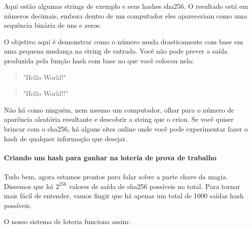 Aqui estão algumas strings de exemplo e seus hashes sha256. O resultado está em números decimais, embora dentro de um computador eles apareceriam como uma sequência binária de uns e zeros.

O objetivo aqui é demonstrar como o número muda drasticamente com base em uma pequena mudança na string de entrada. Você não pode prever a saída produzida pela função hash com base no que você colocou nela:

\begin{samepage}
\begin{quote}{"Hello World!"\newline
}\end{quote}
\end{samepage}

\begin{samepage}
\begin{quote}{"Hello World!!"\newline
}\end{quote}
\end{samepage}

Não há como ninguém, nem mesmo um computador, olhar para o número de aparência aleatória resultante e descobrir a string que o criou. Se você quiser brincar com o sha256, há alguns sites online onde você pode experimentar fazer o hash de qualquer informação que desejar.

\paragraph{Criando um hash para ganhar na loteria de prova de trabalho}
\paragraph{}
 

Tudo bem, agora estamos prontos para falar sobre a parte chave da magia. Dissemos que há \(2^{256}\) valores de saída de sha256 possíveis no total. Para tornar mais fácil de entender, vamos fingir que há apenas um total de 1000 saídas hash possíveis.

O nosso sistema de loteria funciona assim:

